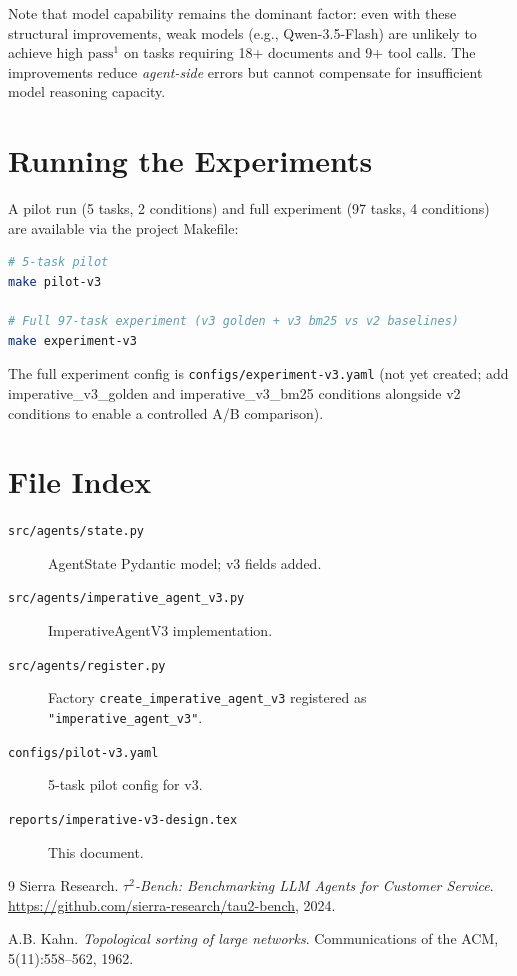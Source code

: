 \documentclass[11pt,a4paper]{article}
\begin{document}
Note that model capability remains the dominant factor: even with these structural
improvements, weak models (e.g., Qwen-3.5-Flash) are unlikely to achieve high $\text{pass}^1$
on tasks requiring 18+ documents and 9+ tool calls. The improvements reduce \emph{agent-side}
errors but cannot compensate for insufficient model reasoning capacity.

\section{Running the Experiments}

A pilot run (5 tasks, 2 conditions) and full experiment (97 tasks, 4 conditions) are
available via the project Makefile:

\begin{lstlisting}[language=bash]
# 5-task pilot
make pilot-v3

# Full 97-task experiment (v3 golden + v3 bm25 vs v2 baselines)
make experiment-v3
\end{lstlisting}

The full experiment config is \texttt{configs/experiment-v3.yaml} (not yet created;
add imperative\_v3\_golden and imperative\_v3\_bm25 conditions alongside v2 conditions
to enable a controlled A/B comparison).

\section{File Index}

\begin{description}
  \item[\texttt{src/agents/state.py}] AgentState Pydantic model; v3 fields added.
  \item[\texttt{src/agents/imperative\_agent\_v3.py}] ImperativeAgentV3 implementation.
  \item[\texttt{src/agents/register.py}] Factory \texttt{create\_imperative\_agent\_v3}
    registered as \texttt{"imperative\_agent\_v3"}.
  \item[\texttt{configs/pilot-v3.yaml}] 5-task pilot config for v3.
  \item[\texttt{reports/imperative-v3-design.tex}] This document.
\end{description}

\begin{thebibliography}{9}
  Sierra Research. \textit{$\tau^2$-Bench: Benchmarking LLM Agents for Customer Service}.
  \url{https://github.com/sierra-research/tau2-bench}, 2024.

  A.B. Kahn. \textit{Topological sorting of large networks}. Communications of the ACM,
  5(11):558--562, 1962.
\end{thebibliography}
\end{document}
